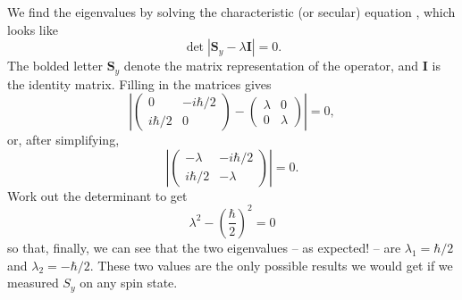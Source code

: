 We find the eigenvalues by solving the characteristic (or secular) equation , which looks like
\begin{equation}
\det | \textbf{S}_y - \lambda \textbf{I} | = 0.
\end{equation}
The bolded letter $\textbf{S}_y$ denote the matrix representation of the operator, and $\textbf{I}$ is the identity matrix.  Filling in the matrices gives
\[
\left| \begin{pmatrix} 0 & -i\hbar/2 \\ i\hbar/2 & 0  \end{pmatrix} - \begin{pmatrix} \lambda &  0 \\ 0 & \lambda \end{pmatrix} \right| = 0,
\]
or, after simplifying,
\[
\left| \begin{pmatrix} -\lambda & -i\hbar/2 \\ i\hbar/2 & -\lambda  \end{pmatrix} \right| = 0.
\]
Work out the determinant to get
\[
\lambda^2 - \left( \frac{\hbar}{2} \right)^2 = 0
\]
so that, finally, we can see that the two eigenvalues -- as expected! -- are $\lambda_1 = \hbar/2$ and $\lambda_2 = -\hbar/2$.  These two values are the only possible results we would get if we measured $S_y$ on any spin state.

